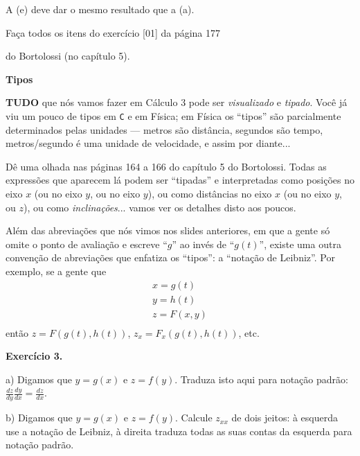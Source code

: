 \documentclass[oneside,12pt]{article}
\begin{document}
A (e) deve dar o mesmo resultado que a (a).

\msk

Faça todos os itens do exercício [01] da página 177

do Bortolossi (no capítulo 5).


\newpage


{\bf Tipos}

\ssk

{\bf TUDO} que nós vamos fazer em Cálculo 3 pode ser {\sl visualizado}
e {\sl tipado}. Você já viu um pouco de tipos em {\tt C} e em Física;
em Física os ``tipos'' são parcialmente determinados pelas unidades
--- metros são distância, segundos são tempo, metros/segundo é uma
unidade de velocidade, e assim por diante...

Dê uma olhada nas páginas 164 a 166 do capítulo 5 do Bortolossi. Todas
as expressões que aparecem lá podem ser ``tipadas'' e interpretadas
como posições no eixo $x$ (ou no eixo $y$, ou no eixo $y$), ou como
distâncias no eixo $x$ (ou no eixo $y$, ou $z$), ou como {\sl
  inclinações}... vamos ver os detalhes disto aos poucos.

\newpage

Além das abreviações que nós vimos nos slides anteriores, em que a
gente só omite o ponto de avaliação e escreve ``$g$'' ao invés de
``$g(t)$'', existe uma outra convenção de abreviações que enfatiza os
``tipos'': a ``notação de Leibniz''. Por exemplo, se a gente
 que
%
$$\begin{array}{rcl}
  x = g(t) \\
  y = h(t) \\
  z = F(x,y) \\
  \end{array}
$$
%
então $z=F(g(t),h(t))$, $z_x = F_x(g(t),h(t))$, etc.

\newpage


{\bf Exercício 3.}

\ssk

a) Digamos que $y = g(x)$ e $z = f(y)$. Traduza isto aqui para notação
padrão: $\frac{dz}{dy} \frac{dy}{dx} = \frac{dz}{dx}$.

b) Digamos que $y = g(x)$ e $z = f(y)$. Calcule $z_{xx}$ de dois
jeitos: à esquerda use a notação de Leibniz, à direita traduza todas
as suas contas da esquerda para notação padrão.
\end{document}

